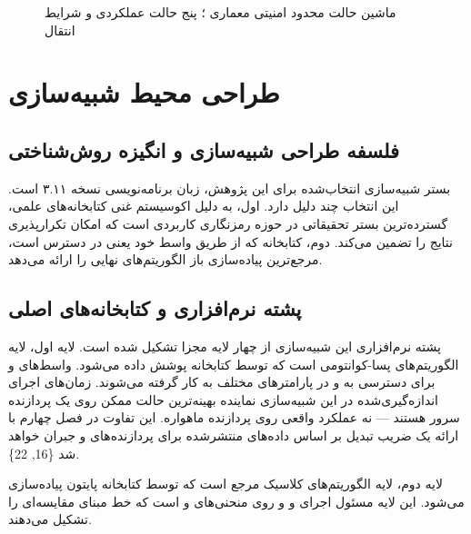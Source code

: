 \documentclass[a4paper,14pt]{extreport}
\begin{document}
\begin{figure}[H]
\centering
{}
\caption{ماشین حالت محدود امنیتی  معماری ؛ پنج حالت عملکردی و شرایط انتقال}
\label{fig:3-4}
\end{figure}
\section{طراحی محیط شبیه‌سازی}

\subsection{فلسفه طراحی شبیه‌سازی و انگیزه روش‌شناختی}

بستر شبیه‌سازی انتخاب‌شده برای این پژوهش، زبان برنامه‌نویسی  نسخه ۳.۱۱ است. این انتخاب چند دلیل دارد. اول،  به دلیل اکوسیستم غنی کتابخانه‌های علمی، گسترده‌ترین بستر تحقیقاتی در حوزه رمزنگاری کاربردی است که امکان تکرارپذیری نتایج را تضمین می‌کند. دوم، کتابخانه  که از طریق واسط  خود یعنی  در دسترس است، مرجع‌ترین پیاده‌سازی باز الگوریتم‌های نهایی  را ارائه می‌دهد.

\subsection{پشته نرم‌افزاری و کتابخانه‌های اصلی}

پشته نرم‌افزاری این شبیه‌سازی از چهار لایه مجزا تشکیل شده است. لایه اول، لایه الگوریتم‌های پسا-کوانتومی است که توسط کتابخانه  پوشش داده می‌شود. واسط‌های  و  برای دسترسی به  و  در پارامترهای مختلف به کار گرفته می‌شوند. زمان‌های اجرای اندازه‌گیری‌شده در این شبیه‌سازی نماینده بهینه‌ترین حالت ممکن روی یک پردازنده سرور هستند --- نه عملکرد واقعی روی پردازنده ماهواره. این تفاوت در فصل چهارم با ارائه یک ضریب تبدیل  بر اساس داده‌های منتشرشده برای پردازنده‌های  و  جبران خواهد شد \{16, 22\}.

لایه دوم، لایه الگوریتم‌های کلاسیک مرجع است که توسط کتابخانه  پایتون پیاده‌سازی می‌شود. این لایه مسئول اجرای  و  و  روی منحنی‌های  و  است که خط مبنای مقایسه‌ای را تشکیل می‌دهند.
\end{document}
